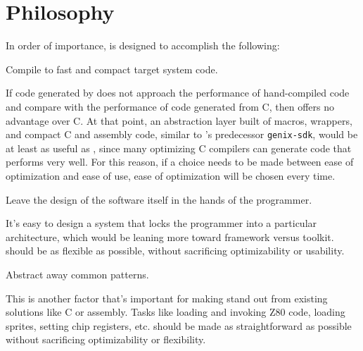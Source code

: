 \section{Philosophy}

In order of importance, \gx{} is designed to accomplish the following:

\begin{enumerate}

{\bf \item Compile to fast and compact target system code.} If code
generated by \gx{} does not approach the performance of hand-compiled code
and compare with the performance of code generated from C, then \gx{}
offers no advantage over C. At that point, an abstraction layer built
of macros, wrappers, and compact C and assembly code, similar to \gx{}'s
predecessor {\tt genix-sdk}, would be at least as useful as \gx{}, since
many optimizing C compilers can generate code that performs very well. For
this reason, if a choice needs to be made between ease of optimization
and ease of use, ease of optimization will be chosen every time.

{\bf \item Leave the design of the software itself in the hands of the
programmer.} It's easy to design a system that locks the programmer into
a particular architecture, which would be leaning more toward framework
versus toolkit. \gx{} should be as flexible as possible, without sacrificing
optimizability or usability.

{\bf \item Abstract away common patterns.} This is another factor that's
important for making \gx{} stand out from existing solutions like C or
assembly. Tasks like loading and invoking Z80 code, loading sprites,
setting chip registers, etc. should be made as straightforward as possible
without sacrificing optimizability or flexibility.

\end{enumerate}

